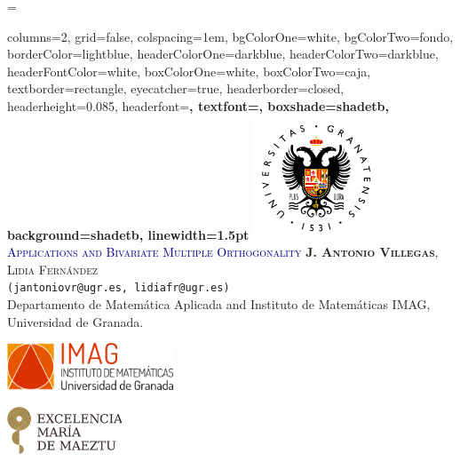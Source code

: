 \documentclass[portrait,final,a0paper,fontscale=0.38]{baposter}
\begin{document}
\emergencystretch=\maxdimen
{}
\begin{poster}%
  {
  columns=2,
  grid=false,
  colspacing=1em,
  bgColorOne=white,
  bgColorTwo=fondo,
  borderColor=lightblue,
  headerColorOne=darkblue,
  headerColorTwo=darkblue,
  headerFontColor=white,
  boxColorOne=white,
  boxColorTwo=caja,
  textborder=rectangle,
  eyecatcher=true,
  headerborder=closed,
  headerheight=0.085\textheight,
  headerfont=\Large\bf\textsc, %
  textfont={\setlength{\parindent}{1.5em}},
  boxshade=shadetb,
  background=shadetb,
  linewidth=1.5pt
  }
  {
  	\includegraphics[height=10em]{ugr}
  }
  {
  	\medskip
  	{\scalebox{1.4}{\LARGE{\bf\textsc{\textcolor{darkblue}{Orthogonal Polynomials}}}}}\\
    {\LARGE \textsc{\textcolor{darkblue}{Applications and Bivariate Multiple Orthogonality}}}\vspace{3pt}
  }
  {
  	\textsc{\textbf{J. Antonio Villegas}, Lidia Fernández}
  	\\
  	\small{\texttt{(jantoniovr@ugr.es, lidiafr@ugr.es)}}
  	\\
  	\normalsize{Departamento de Matem\'{a}tica Aplicada and Instituto de Matemáticas IMAG, Universidad de Granada.}
  }
  {
  	\includegraphics[height=3.8em]{IMAG}
    
  	\includegraphics[height=3.8em]{maeztu}
  }




\end{poster}
\end{document}
